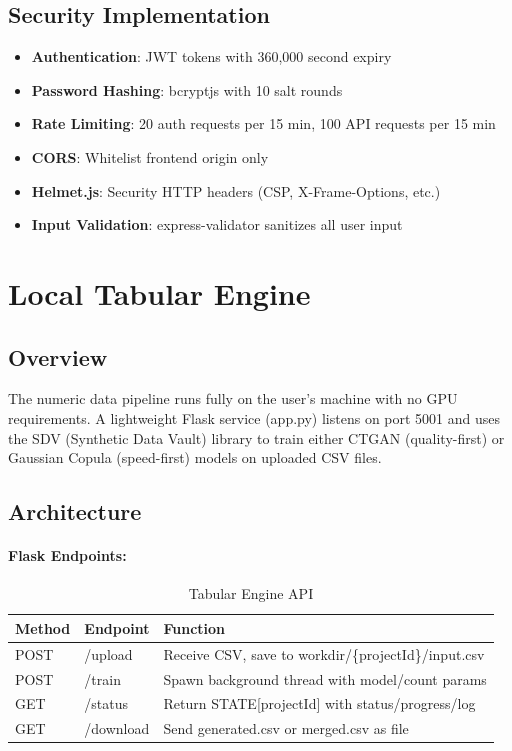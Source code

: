\documentclass[11pt,a4paper]{article}
\begin{document}
\subsection{Security Implementation}
\begin{itemize}[noitemsep]
    \item \textbf{Authentication}: JWT tokens with 360,000 second expiry
    \item \textbf{Password Hashing}: bcryptjs with 10 salt rounds
    \item \textbf{Rate Limiting}: 20 auth requests per 15 min, 100 API requests per 15 min
    \item \textbf{CORS}: Whitelist frontend origin only
    \item \textbf{Helmet.js}: Security HTTP headers (CSP, X-Frame-Options, etc.)
    \item \textbf{Input Validation}: express-validator sanitizes all user input
\end{itemize}

\section{Local Tabular Engine}

\subsection{Overview}
The numeric data pipeline runs fully on the user's machine with no GPU requirements. A lightweight Flask service (app.py) listens on port 5001 and uses the SDV (Synthetic Data Vault) library to train either CTGAN (quality-first) or Gaussian Copula (speed-first) models on uploaded CSV files.

\subsection{Architecture}

\paragraph{Flask Endpoints:}
\begin{table}[H]
\centering
\small
\begin{tabular}{llp{5cm}}
\toprule
\textbf{Method} & \textbf{Endpoint} & \textbf{Function} \\
\midrule
POST & /upload & Receive CSV, save to workdir/\{projectId\}/input.csv \\
POST & /train & Spawn background thread with model/count params \\
GET & /status & Return STATE[projectId] with status/progress/log \\
GET & /download & Send generated.csv or merged.csv as file \\
\bottomrule
\end{tabular}
\caption{Tabular Engine API}
\end{table}
\end{document}
